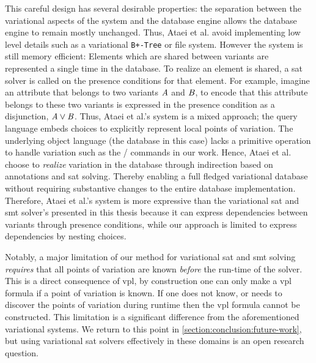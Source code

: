 This careful design has several desirable properties: the separation between the
variational aspects of the system and the database engine allows the database
engine to remain mostly unchanged. Thus, Ataei et al. avoid implementing low
level details such as a variational \texttt{B+-Tree} or file system. However the
system is still memory efficient: Elements which are shared between variants are
represented a single time in the database. To realize an element is shared, a
\ac{sat} solver is called on the presence conditions for that element. For
example, imagine an attribute that belongs to two variants $\mathit{A}$ and
$\mathit{B}$, to encode that this attribute belongs to these two variants is
expressed in the presence condition as a disjunction, $\mathit{A \vee B}$. Thus,
Ataei et al.'s system is a mixed approach; the query language embeds choices to
explicitly represent local points of variation. The underlying object language
(the database in this case) lacks a primitive operation to handle variation such
as the / commands in our work. Hence, Ataei et al. choose to
\emph{realize} variation in the database through indirection based on
annotations and \ac{sat} solving. Thereby enabling a full fledged variational
database without requiring substantive changes to the entire database
implementation. Therefore, Ataei et al.'s system is more expressive than the
variational \ac{sat} and \ac{smt} solver's presented in this thesis because it
can express dependencies between variants through presence conditions, while our
approach is limited to express dependencies by nesting choices.

Notably, a major limitation of our method for variational \ac{sat} and \ac{smt}
solving \emph{requires} that all points of variation are known \emph{before} the
run-time of the solver. This is a direct consequence of \ac{vpl}, by
construction one can only make a \ac{vpl} formula if a point of variation is
known. If one does not know, or needs to discover the points of variation during
runtime then the \ac{vpl} formula cannot be constructed. This limitation is a
significant difference from the aforementioned variational systems. We return to
this point in \autoref{section:conclusion:future-work}, but using variational
\ac{sat} solvers effectively in these domains is an open research question.

